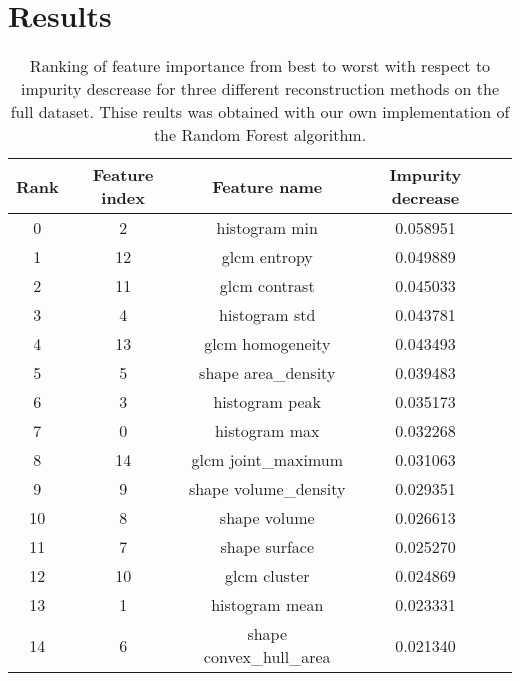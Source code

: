 \section{Results}


\begin{table}[H]
    \centering
    \centering
    \caption{Ranking of feature importance from best to worst with respect to
    impurity descrease for three different reconstruction methods on the full
    dataset. Thise reults was obtained with our own implementation of the
Random Forest algorithm. }  
    \label{tab:feature_importance_own}  

    \begin{tabular}{|c|c|c|c|c|}
        \hline
        Rank & Feature index & Feature name & Impurity decrease \\     
        \hline
            0       & 2           & histogram min  & 0.058951 \\ 
            1      & 12            & glcm entropy  & 0.049889  \\ 
            2      & 11           & glcm contrast  & 0.045033  \\ 
            3       & 4           & histogram std  & 0.043781  \\ 
            4      & 13        & glcm homogeneity  & 0.043493  \\ 
            5       & 5      & shape area\_density  & 0.039483  \\ 
            6       & 3          & histogram peak  & 0.035173  \\ 
            7       & 0           & histogram max  & 0.032268  \\ 
            8      & 14      & glcm joint\_maximum  & 0.031063  \\ 
            9       & 9    & shape volume\_density  & 0.029351  \\ 
            10      & 8            & shape volume  & 0.026613  \\ 
            11      & 7           & shape surface  & 0.025270  \\ 
            12     & 10            & glcm cluster  & 0.024869  \\ 
            13      & 1          & histogram mean  & 0.023331  \\ 
            14      & 6  & shape convex\_hull\_area  & 0.021340  \\ 
        \hline
    \end{tabular} 
\end{table}



